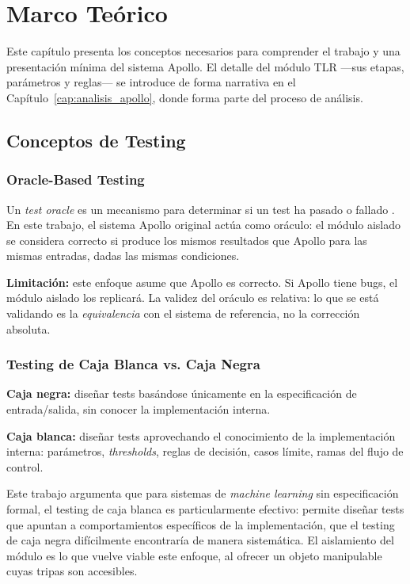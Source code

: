 \chapter{Marco Teórico}
\label{cap:marco_teorico}

Este capítulo presenta los conceptos necesarios para comprender el trabajo y una presentación mínima del sistema Apollo. El detalle del módulo TLR ---sus etapas, parámetros y reglas--- se introduce de forma narrativa en el Capítulo~\ref{cap:analisis_apollo}, donde forma parte del proceso de análisis.

\section{Conceptos de Testing}

\subsection{Oracle-Based Testing}

Un \textit{test oracle} es un mecanismo para determinar si un test ha pasado o fallado \cite{barr2015oracle}. En este trabajo, el sistema Apollo original actúa como oráculo: el módulo aislado se considera correcto si produce los mismos resultados que Apollo para las mismas entradas, dadas las mismas condiciones.

\textbf{Limitación:} este enfoque asume que Apollo es correcto. Si Apollo tiene bugs, el módulo aislado los replicará. La validez del oráculo es relativa: lo que se está validando es la \textit{equivalencia} con el sistema de referencia, no la corrección absoluta.

\subsection{Testing de Caja Blanca vs. Caja Negra}

\textbf{Caja negra:} diseñar tests basándose únicamente en la especificación de entrada/salida, sin conocer la implementación interna.

\textbf{Caja blanca:} diseñar tests aprovechando el conocimiento de la implementación interna: parámetros, \textit{thresholds}, reglas de decisión, casos límite, ramas del flujo de control.

Este trabajo argumenta que para sistemas de \textit{machine learning} sin especificación formal, el testing de caja blanca es particularmente efectivo: permite diseñar tests que apuntan a comportamientos específicos de la implementación, que el testing de caja negra difícilmente encontraría de manera sistemática. El aislamiento del módulo es lo que vuelve viable este enfoque, al ofrecer un objeto manipulable cuyas tripas son accesibles.


